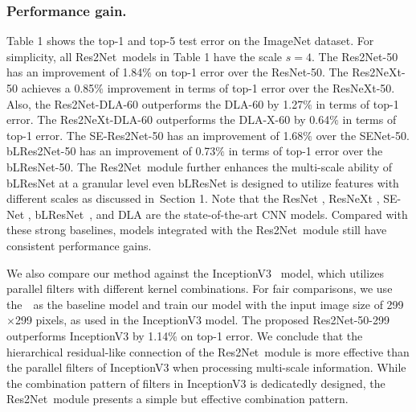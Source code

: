 \documentclass[10pt,journal,cspaper,compsoc]{IEEEtran}
\newcommand{\figref}[1]{Figure 1}%
\newcommand{\tabref}[1]{Table 1}%
\newcommand{\secref}[1]{Section 1}
\newcommand{\figref}[1]{Fig.~\ref{#1}}%
\newcommand{\tabref}[1]{Table~\ref{#1}}%
\newcommand{\secref}[1]{Sec.~\ref{#1}}
\newcommand{\myPara}[1]{\subsubsection{#1}}
\newcommand{\ourM}{{Res2Net}}
\begin{document}
\myPara{Performance gain.}
\tabref{tab:imagenet_prec} shows the top-1 and top-5 test error 
on the ImageNet dataset.
%
For simplicity, all \ourM~models in \tabref{tab:imagenet_prec} 
have the scale $s=4$.
The \ourM-50 has an improvement of 1.84$\%$ on top-1 error over the ResNet-50.
%
The Res2NeXt-50 achieves a 0.85$\%$ improvement in terms of top-1 error 
over the ResNeXt-50.
%
Also, the Res2Net-DLA-60 outperforms the DLA-60 by
1.27$\%$ in terms of top-1 error.
%
The Res2NeXt-DLA-60 outperforms the DLA-X-60 by
0.64$\%$ in terms of top-1 error.
%
The SE-Res2Net-50 has an improvement of 1.68$\%$ over the SENet-50.
%
bLRes2Net-50 has an improvement of 0.73$\%$ in terms of top-1 error 
over the bLResNet-50.
The \ourM~module further enhances the multi-scale ability of bLResNet 
at a granular level even bLResNet is designed to utilize features 
with different scales as discussed in~\secref{sec:Concurrent_works}.
% 
Note that the ResNet \cite{he2016deep}, ResNeXt \cite{xie2017aggregated},
SE-Net \cite{hu2018senet}, bLResNet~\cite{chen2018biglittle}, 
and DLA \cite{yu2018deep} are the state-of-the-art CNN models.
%
Compared with these strong baselines,
models integrated with the \ourM~module still have consistent performance gains.


We also compare our method against the 
InceptionV3~\cite{szegedy2016rethinking} model,
which  utilizes parallel filters with different kernel combinations.
%
For fair comparisons, we use the~\ResNet~as the baseline model and
train our model with the input image size of 299$\times$299 pixels,
as used in the InceptionV3 model.
%
The proposed \ourM-50-299 outperforms InceptionV3 by 1.14$\%$ on top-1 error.
We conclude that the hierarchical residual-like connection of the \ourM~module is more
effective than the parallel filters of InceptionV3 when processing multi-scale information.
While the combination pattern of filters in InceptionV3 is dedicatedly designed,
the \ourM~module presents a simple but effective combination pattern.





\end{document}
